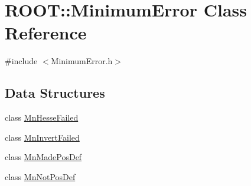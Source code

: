 \hypertarget{classROOT_1_1Minuit2_1_1MinimumError}{}\section{R\+O\+OT\+:\+:Minimum\+Error Class Reference}
\label{classROOT_1_1Minuit2_1_1MinimumError}


{\ttfamily \#include $<$Minimum\+Error.\+h$>$}

\subsection*{Data Structures}
\begin{DoxyCompactItemize}
\item 
class \mbox{\hyperlink{classROOT_1_1Minuit2_1_1MinimumError_1_1MnHesseFailed}{Mn\+Hesse\+Failed}}
\item 
class \mbox{\hyperlink{classROOT_1_1Minuit2_1_1MinimumError_1_1MnInvertFailed}{Mn\+Invert\+Failed}}
\item 
class \mbox{\hyperlink{classROOT_1_1Minuit2_1_1MinimumError_1_1MnMadePosDef}{Mn\+Made\+Pos\+Def}}
\item 
class \mbox{\hyperlink{classROOT_1_1Minuit2_1_1MinimumError_1_1MnNotPosDef}{Mn\+Not\+Pos\+Def}}
\end{DoxyCompactItemize}
